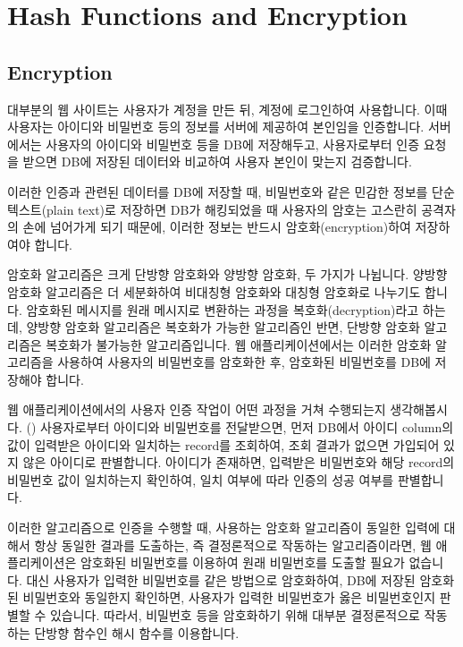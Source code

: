 \section{Hash Functions and Encryption}\label{sect:hash-functions-and-encryption}

\subsection*{Encryption}

대부분의 웹 사이트는 사용자가 계정을 만든 뒤, 계정에 로그인하여 사용합니다. 이때 사용자는 아이디와 비밀번호 등의 정보를 서버에 제공하여 본인임을 인증합니다. 서버에서는 사용자의 아이디와 비밀번호 등을 DB에 저장해두고, 사용자로부터 인증 요청을 받으면 DB에 저장된 데이터와 비교하여 사용자 본인이 맞는지 검증합니다.

이러한 인증과 관련된 데이터를 DB에 저장할 때, 비밀번호와 같은 민감한 정보를 단순 텍스트(plain text)로 저장하면 DB가 해킹되었을 때 사용자의 암호는 고스란히 공격자의 손에 넘어가게 되기 때문에, 이러한 정보는 반드시 암호화(encryption)하여 저장하여야 합니다.

암호화 알고리즘은 크게 단방향 암호화와 양방향 암호화, 두 가지가 나뉩니다. 양방향 암호화 알고리즘은 더 세분화하여 비대칭형 암호화와 대칭형 암호화로 나누기도 합니다. 암호화된 메시지를 원래 메시지로 변환하는 과정을 복호화(decryption)라고 하는데, 양방향 암호화 알고리즘은 복호화가 가능한 알고리즘인 반면, 단방향 암호화 알고리즘은 복호화가 불가능한 알고리즘입니다. 웹 애플리케이션에서는 이러한 암호화 알고리즘을 사용하여 사용자의 비밀번호를 암호화한 후, 암호화된 비밀번호를 DB에 저장해야 합니다.

웹 애플리케이션에서의 사용자 인증 작업이 어떤 과정을 거쳐 수행되는지 생각해봅시다. () 사용자로부터 아이디와 비밀번호를 전달받으면, 먼저 DB에서 아이디 column의 값이 입력받은 아이디와 일치하는 record를 조회하여, 조회 결과가 없으면 가입되어 있지 않은 아이디로 판별합니다. 아이디가 존재하면, 입력받은 비밀번호와 해당 record의 비밀번호 값이 일치하는지 확인하여, 일치 여부에 따라 인증의 성공 여부를 판별합니다.


이러한 알고리즘으로 인증을 수행할 때, 사용하는 암호화 알고리즘이 동일한 입력에 대해서 항상 동일한 결과를 도출하는, 즉 결정론적으로 작동하는 알고리즘이라면, 웹 애플리케이션은 암호화된 비밀번호를 이용하여 원래 비밀번호를 도출할 필요가 없습니다. 대신 사용자가 입력한 비밀번호를 같은 방법으로 암호화하여, DB에 저장된 암호화된 비밀번호와 동일한지 확인하면, 사용자가 입력한 비밀번호가 옳은 비밀번호인지 판별할 수 있습니다. 따라서, 비밀번호 등을 암호화하기 위해 대부분 결정론적으로 작동하는 단방향 함수인 해시 함수를 이용합니다.

